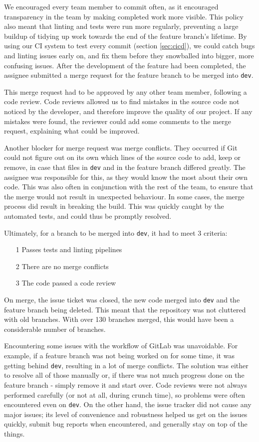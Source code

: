 \documentclass{l3proj}
\begin{document}
We encouraged every team member to commit often, as it encouraged transparency
 in the team by making completed work more visible. This policy also meant 
 that linting and tests were run more regularly, preventing a large buildup
 of tidying up work towards the end of the feature branch's lifetime.
 By using our CI system to test every commit (section \ref{sec:cicd}), we could
 catch bugs and linting issues early on, and fix them before they snowballed into
 bigger, more confusing issues. After the development of the feature had been completed, the assignee
 submitted a merge request for the feature branch to be merged into \texttt{dev}.
 
This merge request had to be approved by any other team member, following a
 code review. Code reviews allowed us to find mistakes in the source code not
 noticed by the developer, and therefore improve the quality of our project.
 If any mistakes were found, the reviewer could add some comments to the merge
 request, explaining what could be improved. 
 
Another blocker for merge request was merge conflicts. They occurred if Git could not
 figure out on its own which lines of the source code to add, keep or
 remove, in case that files in \texttt{dev} and in the feature branch differed
 greatly. The assignee was responsible for this, as they would know the most about their
 own code. This was also often in conjunction with the rest of the team, to ensure that the merge
 would not result in unexpected behaviour. In some cases, the merge process did result
 in breaking the build. This was quickly caught by the automated tests, and could
 thus be promptly resolved. 
 
Ultimately, for a branch to be merged into \texttt{dev}, it had to meet 3 criteria:
\begin{itemize}
\item[1] Passes tests and linting pipelines
\item[2] There are no merge conflicts
\item[3] The code passed a code review
\end{itemize}
On merge, the issue ticket was closed, the new code merged into \texttt{dev}
 and the feature branch being deleted. This meant that the repository was not 
 cluttered with old branches. With over 130 branches merged, this would have been
 a considerable number of branches.

Encountering some issues with the workflow of GitLab was unavoidable.
 For example, if a feature branch was not being worked on for some time,
 it was getting behind \texttt{dev}, resulting in a lot of merge conflicts.
 The solution was either to resolve all of those manually or, if
 there was not much progress done on the feature branch - simply remove
 it and start over. Code reviews were not always performed carefully
 (or not at all, during crunch time), so problems were often encountered
 even on \texttt{dev}. On the other hand, the issue tracker did not
 cause any major issues; its level of convenience and robustness helped
 us get on the issues quickly, submit bug reports when encountered,
 and generally stay on top of the things.
\end{document}
